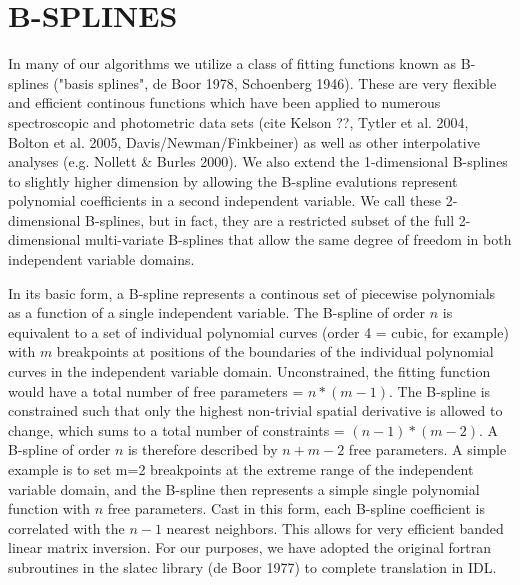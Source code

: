 \documentclass[12pt,preprint]{aastex}
\begin{document}
\appendix
\section{B-SPLINES}
\label{bsplines}

In many of our algorithms we utilize a class of fitting functions known
as B-splines ("basis splines", de Boor 1978, Schoenberg 1946).  
These are very flexible and efficient 
continous functions which have been applied to numerous spectroscopic
and photometric data sets (cite Kelson ??, Tytler et al. 2004, 
Bolton et al. 2005, Davis/Newman/Finkbeiner) as well as other interpolative
analyses (e.g. Nollett \& Burles 2000).  
We also extend the 1-dimensional
B-splines to slightly higher dimension by allowing the B-spline evalutions
represent polynomial coefficients in a second independent variable.  We 
call these 2-dimensional B-splines, but in fact, 
they are a restricted subset of the full 2-dimensional multi-variate B-splines 
that allow the same degree of freedom in both independent variable domains.

In its basic form, a B-spline represents
a continous set of piecewise polynomials as a function of a single independent
variable.  The B-spline of order $n$ is equivalent to a set 
of individual polynomial curves (order 4 = cubic, for example) with $m$ 
breakpoints at positions of the boundaries of the individual polynomial 
curves in the independent variable domain.  Unconstrained, the fitting function
would have a total number of free parameters = $n * (m-1)$.  The B-spline is
constrained such that only the highest non-trivial spatial derivative is
allowed to change, which sums to a total number of constraints = 
$(n-1) * (m-2)$.  A B-spline of order $n$ is therefore described by 
$n + m - 2$ free parameters.  A simple example is to set m=2 breakpoints at
the extreme range of the independent variable domain, and the B-spline then
represents a simple single polynomial function with $n$ free parameters.
Cast in this form, each B-spline coefficient is correlated with the
$n-1$ nearest neighbors.  This allows for very efficient banded linear matrix
inversion.  For our purposes, we have adopted the original fortran subroutines
in the slatec library (de Boor 1977) to complete translation in IDL.

\end{document}

